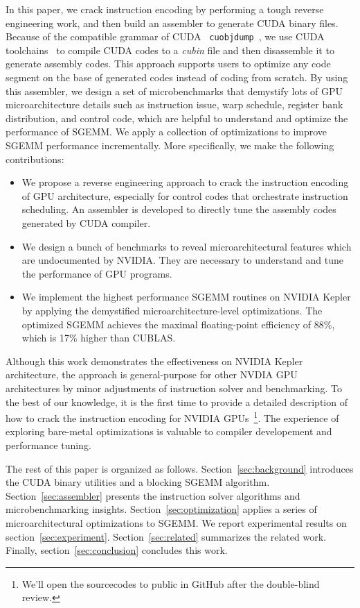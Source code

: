In this paper, we crack instruction encoding by performing a tough reverse engineering work, and then build an 
assembler to generate CUDA binary files. Because of the compatible grammar of CUDA {\tt 
cuobjdump}~\cite{cubin2015util}, we use CUDA toolchains~\cite{nvcc} to compile CUDA codes to a {\em cubin} file and 
then disassemble it to generate assembly codes. This approach supports users to optimize any code segment on the base 
of generated codes instead of coding from scratch. By using this assembler, we design a set of microbenchmarks that 
demystify lots of GPU microarchitecture details such as instruction issue, warp schedule, register bank distribution, 
and control code, which are helpful to understand and optimize the performance of SGEMM. We apply a collection of 
optimizations to improve SGEMM performance incrementally. More specifically, we make the following contributions:
\begin{itemize}
\item We propose a reverse engineering approach to crack the instruction encoding of GPU architecture, especially for 
control codes that orchestrate instruction scheduling. An assembler is developed to directly tune the assembly codes 
generated by CUDA compiler.
\item We design a bunch of benchmarks to reveal microarchitectural features which are undocumented by NVIDIA. They are 
necessary to understand and tune the performance of GPU programs.
\item We implement the highest performance SGEMM routines on NVIDIA Kepler by applying the demystified 
microarchitecture-level optimizations. The optimized SGEMM achieves the maximal floating-point efficiency of 88\%, 
which is 17\% higher than CUBLAS.
\end{itemize}

Although this work demonstrates the effectiveness on NVIDIA Kepler architecture, the approach is general-purpose for 
other NVDIA GPU architectures by minor adjustments of instruction solver and benchmarking. To the best of our 
knowledge, it is the first time to provide a detailed description of how to crack the instruction encoding for NVIDIA 
GPUs~\footnote{We'll open the sourcecodes to public in GitHub after the double-blind review.}. The experience of 
exploring bare-metal optimizations is valuable to compiler developement and performance tuning.

The rest of this paper is organized as follows. Section~\ref{sec:background} introduces the CUDA binary utilities and a 
blocking SGEMM algorithm. Section~\ref{sec:assembler} presents the instruction solver algorithms and microbenchmarking 
insights. Section~\ref{sec:optimization} applies a series of microarchitectural optimizations to SGEMM. We report 
experimental results on section~\ref{sec:experiment}. Section~\ref{sec:related} summarizes the related work. Finally, 
section~\ref{sec:conclusion} concludes this work. 
